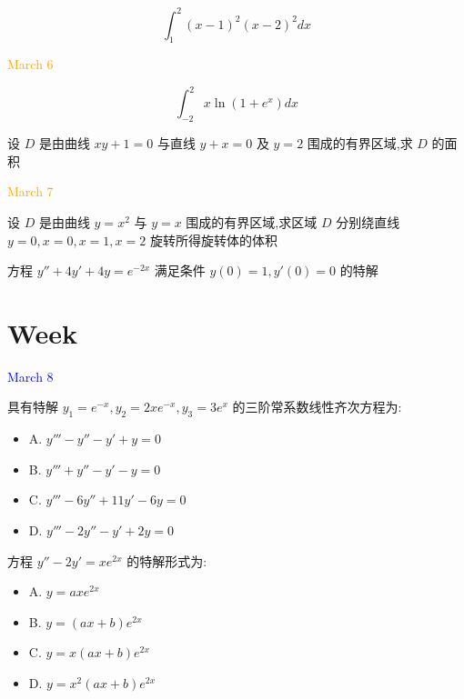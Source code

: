 \begin{example}[][Exam: 29.1.10]
	$$\int_{1}^{2}(x-1)^{2}(x-2)^{2}dx$$
\end{example}

\textcolor{orange}{March 6}

\begin{example}[][Exam: 29.1.11]
	$$\int_{-2}^{2}x\ln(1+e^{x})dx$$
\end{example}

\begin{example}[][Exam: 29.1.12]
	设 $D$ 是由曲线 $xy+1=0$ 与直线 $y+x=0$ 及 $y=2$ 围成的有界区域,求 $D$ 的面积
\end{example}

\textcolor{orange}{March 7}

\begin{example}[][Exam: 29.1.13]
	设 $D$ 是由曲线 $y=x^{2}$ 与 $y=x$ 围成的有界区域,求区域 $D$ 分别绕直线 $y=0,x=0,x=1,x=2$ 旋转所得旋转体的体积
\end{example}

\begin{example}[][Exam: 29.1.14]
	方程 $y''+4y'+4y=e^{-2x}$ 满足条件 $y(0)=1,y'(0)=0$ 的特解
\end{example}

\section{Week }
\textcolor{blue}{March 8}

\begin{example}[][Exam: 29.2.1]
	具有特解 $y_{1}=e^{-x},y_{2}=2xe^{-x},y_{3}=3e^{x}$ 的三阶常系数线性齐次方程为:
\begin{itemize}
	\item A. $y'''-y''-y'+y=0$
	\item B. $y'''+y''-y'-y=0$
	\item C. $y'''-6y''+11y'-6y=0$
	\item D. $y'''-2y''-y'+2y=0$
\end{itemize}
\end{example}

\begin{example}[][Exam: 29.2.2]
	方程 $y''-2y'=xe^{2x}$ 的特解形式为:
\begin{itemize}
	\item A. $y=axe^{2x}$
	\item B. $y=(ax+b)e^{2x}$
	\item C. $y=x(ax+b)e^{2x}$
	\item D. $y=x^{2}(ax+b)e^{2x}$
\end{itemize}
\end{example}

